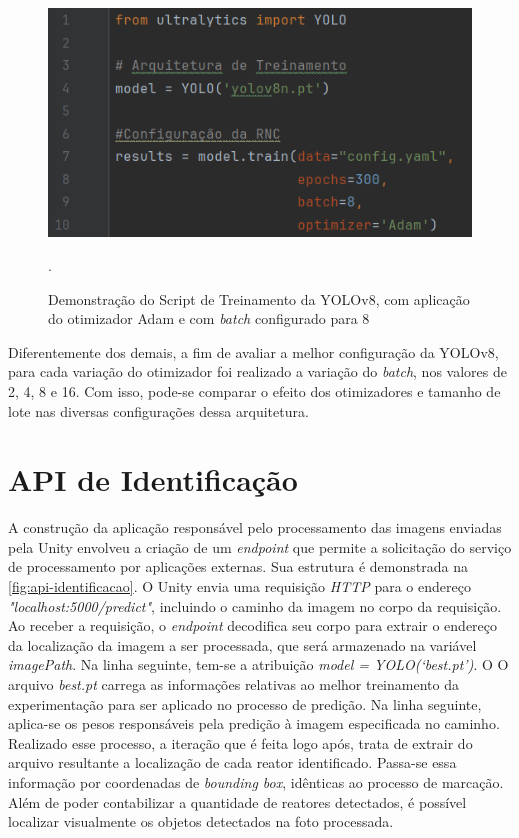 \begin{figure}[!h]
    \centering
    \begin{minipage}{0.7\linewidth}
    \centering
    \captionsetup{justification=centering,margin=0.5cm,font=small}
    \includegraphics[width=1\linewidth]{img/cap5/yolov8-adam.png}
    \caption{Demonstração do Script de Treinamento da YOLOv8, com aplicação do otimizador Adam e com \textit{batch} configurado para 8}.
    \label{fig:script-yolov8}
    \end{minipage}
\end{figure}

Diferentemente dos demais, a fim de avaliar a melhor configuração da YOLOv8, para cada variação do otimizador foi realizado a variação do \textit{batch}, nos valores de 2, 4, 8 e 16. Com isso, pode-se comparar o efeito dos otimizadores e tamanho de lote nas diversas configurações dessa arquitetura.

\section{API de Identificação}

A construção da aplicação responsável pelo processamento das imagens enviadas pela Unity envolveu a criação de um \textit{endpoint} que permite a solicitação do serviço de processamento por aplicações externas. Sua estrutura é demonstrada na \ref{fig:api-identificacao}. O Unity envia uma requisição \textit{HTTP} para o endereço \textit{"localhost:5000/predict"}, incluindo o caminho da imagem no corpo da requisição. Ao receber a requisição, o \textit{endpoint} decodifica seu corpo para extrair o endereço da localização da imagem a ser processada, que será armazenado na variável \textit{imagePath}. Na linha seguinte, tem-se a atribuição \textit{model = YOLO(‘best.pt’)}. O O arquivo \textit{best.pt} carrega as informações relativas ao melhor treinamento da experimentação para ser aplicado no processo de predição. Na linha seguinte, aplica-se os pesos responsáveis pela predição à imagem especificada no caminho. Realizado esse processo, a iteração que é feita logo após, trata de extrair do arquivo resultante a localização de cada reator identificado. Passa-se essa informação por coordenadas de \textit{bounding box}, idênticas ao processo de marcação. Além de poder contabilizar a quantidade de reatores detectados, é possível localizar visualmente os objetos detectados na foto processada.

